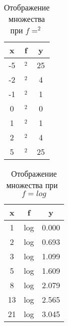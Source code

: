 \documentclass[]{scrartcl}
\begin{document}
{{\begin{table}[ht]
	\caption{Отображение множества при $f=^2$} \label{tab:function-square}
	\centering%
	\begin{tabular}{ccc} 
		\hline
		x  & f & y 
		\\ \hline \hline
		-5 & $^2$ & 25 \\ 
		-2 & $^2$ & 4 \\ 
		-1 & $^2$ & 1 \\ 
		0 & $^2$ & 0 \\ 
		1 & $^2$ & 1 \\ 
		2 & $^2$ & 4 \\ 
		5 & $^2$ & 25 \\
		\hline	
	\end{tabular}
\end{table}

\begin{table}[ht]
	\caption{Отображение множества при~$f=log$} \label{tab:function-log}
	\centering%
	\begin{tabular}{ccc} 
		\hline
		x  & f & y 
		\\ \hline \hline
		1 & log & 0.000 \\ 
		2 & log & 0.693 \\ 
		3 & log & 1.099 \\ 
		5 & log & 1.609 \\ 
		8 & log & 2.079 \\ 
		13 & log & 2.565 \\ 
		21 & log & 3.045 \\ 
		\hline	
	\end{tabular}
\end{table}

}}
\end{document}
